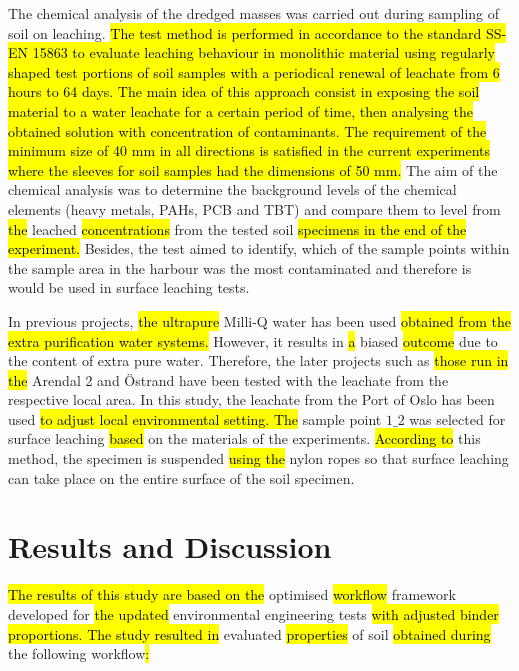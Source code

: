 \documentclass[algorithms,article,submit,pdftex,moreauthors]{Definitions/mdpi}
\begin{document}
The chemical analysis of the dredged masses was carried out during sampling of soil on leaching. \hl{The test method is performed in accordance to the standard SS-EN 15863 to evaluate leaching behaviour in monolithic material using regularly shaped test portions of soil samples with a periodical renewal of leachate from 6 hours to 64 days. The main idea of this approach consist in exposing the soil material to a water leachate for a certain period of time, then analysing the obtained solution with concentration of contaminants. The requirement of the minimum size of 40 mm in all directions is satisfied in the current experiments where the sleeves for soil samples had the dimensions of 50 mm. }The aim of the chemical analysis was to determine the background levels of the chemical elements (heavy metals, PAHs, PCB and TBT) and compare them to level from \hl{the }leached \hl{concentrations} from the tested soil \hl{specimens in the end of the experiment. }Besides, the test aimed to identify, which of the sample points within the sample area in the harbour was the most contaminated and therefore is would be used in surface leaching tests. 

In previous projects, \hl{the ultrapure }Milli-Q water has been used \hl{obtained from the extra purification water systems. }However, it results in \hl{a} biased \hl{outcome} due to the content of extra pure water. Therefore, the later projects such as \hl{those run in the }Arendal 2 and Östrand have been tested with the leachate from the respective local area. In this study, the leachate from the Port of Oslo has been used \hl{to adjust local environmental setting. The} sample point $1\_2$ was selected for surface leaching \hl{based} on the materials of the experiments. \hl{According to} this method, the specimen is suspended \hl{using the} nylon ropes so that surface leaching can take place on the entire surface of the soil specimen. 

\section{Results and Discussion}

\hl{The results of this study are based on the} optimised \hl{workflow }framework developed for \hl{the updated }environmental engineering tests \hl{with adjusted binder proportions. The study resulted in } evaluated \hl{properties} of soil \hl{obtained during} the following workflow\hl{:} 
\end{document}
